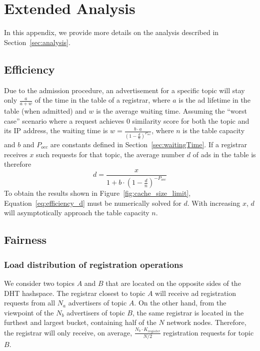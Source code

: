 
\appendix\label{sec:appendix}
\section{Extended Analysis}

In this appendix, we provide more details on the analysis described in Section~\ref{sec:analysis}.

\subsection{Efficiency}

Due to the admission procedure, an advertisement for a specific topic will stay only $\frac{a}{a+w}$ of the time in the table of a registrar, where $a$ is the ad lifetime in the table (when admitted) and $w$ is the average waiting time. Assuming the ``worst case'' scenario where a request achieves 0 similarity score for both the topic and its IP address, the waiting time is $w = \frac{b\cdot a}{(1 - \frac{d}{n})^{P_{occ}}}$, where $n$ is the table capacity and $b$ and $P_{occ}$ are constants defined in Section~\ref{sec:waitingTime}.
If a registrar receives $x$ such requests for that topic, the average number $d$ of ads in the table is therefore
\begin{equation}
d = \frac{x}{1 + b \cdot (1 - \frac{d}{n})^{-P_{occ}}} \label{eq:efficiency_d}
\end{equation}
To obtain the results shown in Figure~\ref{fig:cache_size_limit}, Equation~\ref{eq:efficiency_d} must be numerically solved for $d$. With increasing $x$, $d$ will asymptotically approach the table capacity $n$.

\subsection{Fairness}

\subsubsection{Load distribution of registration operations}

We consider two topics $A$ and $B$ that are located on the opposite sides of the DHT hashspace. The registrar closest to topic $A$ will receive ad registration requests from all $N_a$ advertisers of topic $A$. On the other hand, from the viewpoint of the $N_b$ advertisers of topic $B$, the same registrar is located in the furthest  and largest bucket, containing half of the $N$ network nodes. Therefore, the registrar will only receive, on average, $\frac{N_b\cdot K_{register}}{N/2}$ registration requests for topic $B$.

